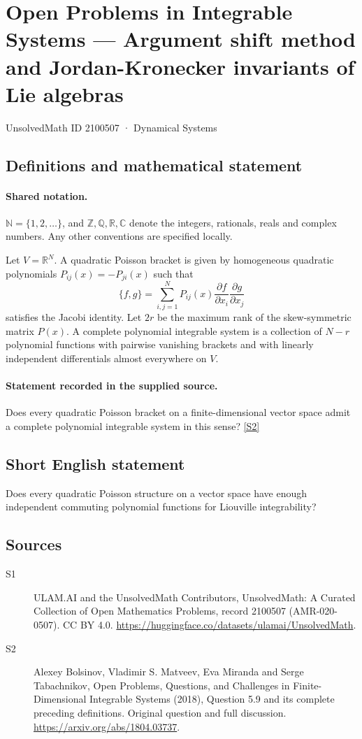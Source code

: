 \documentclass[11pt]{article}
\newcommand{\sref}[2]{\hyperlink{source:#1:#2}{[S#2]}}
\begin{document}
\setcounter{section}{2100506}
\section{Open Problems in Integrable Systems — Argument shift method and Jordan-Kronecker invariants of Lie algebras}\label{2100507}
{\small\sffamily UnsolvedMath ID 2100507 · Dynamical Systems}
\subsection{Definitions and mathematical statement}

\paragraph{Shared notation.}$\mathbb N=\{1,2,\ldots\}$, and $\mathbb Z,\mathbb Q,\mathbb R,\mathbb C$ denote the integers, rationals, reals and complex numbers. Any other conventions are specified locally.


Let $V=\mathbb R^N$. A quadratic Poisson bracket is given by homogeneous quadratic polynomials $P_{ij}(x)=-P_{ji}(x)$ such that
\[\{f,g\}=\sum_{i,j=1}^N P_{ij}(x)\frac{\partial f}{\partial x_i}\frac{\partial g}{\partial x_j}\]
satisfies the Jacobi identity. Let $2r$ be the maximum rank of the skew-symmetric matrix $P(x)$. A complete polynomial integrable system is a collection of $N-r$ polynomial functions with pairwise vanishing brackets and with linearly independent differentials almost everywhere on $V$.
\paragraph{Statement recorded in the supplied source.}
Does every quadratic Poisson bracket on a finite-dimensional vector space admit a complete polynomial integrable system in this sense? \sref{2100507}{2}
\subsection{Short English statement}
Does every quadratic Poisson structure on a vector space have enough independent commuting polynomial functions for Liouville integrability?
\subsection{Sources}
\begin{description}
\item[\hypertarget{source:2100507:1}{S1}] ULAM.AI and the UnsolvedMath Contributors, UnsolvedMath: A Curated Collection of Open Mathematics Problems, record 2100507 (AMR-020-0507). CC BY 4.0. \url{https://huggingface.co/datasets/ulamai/UnsolvedMath}.
\item[\hypertarget{source:2100507:2}{S2}] Alexey Bolsinov, Vladimir S. Matveev, Eva Miranda and Serge Tabachnikov, Open Problems, Questions, and Challenges in Finite-Dimensional Integrable Systems (2018), Question 5.9 and its complete preceding definitions. Original question and full discussion. \url{https://arxiv.org/abs/1804.03737}.

\end{description}
\label{end:2100507}
\end{document}
